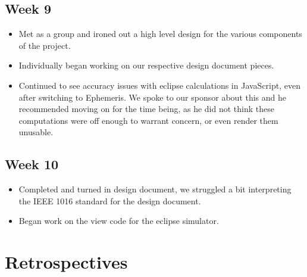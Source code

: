 \documentclass[10pt, onecolumn, draftclsnofoot, letterpaper, compsoc]{IEEEtran}
\begin{document}
\subsection{Week 9}

    \begin{itemize}

    \item Met as a group and ironed out a high level design for the various 
    components of the project. 

    \item Individually began working on our respective design document pieces.

    \item Continued to see accuracy issues with eclipse calculations in 
    JavaScript, even after switching to Ephemeris. We spoke to our sponsor about 
    this and he recommended moving on for the time being, as he did not think 
    these computations were off enough to warrant concern, or even render them 
    unusable.

    \end{itemize}

\subsection{Week 10}

    \begin{itemize}

    \item Completed and turned in design document, we struggled a bit 
    interpreting the IEEE 1016 standard for the design document.

    \item Began work on the view code for the eclipse simulator.

    \end{itemize}

\newpage
\section{Retrospectives}
\end{document}

